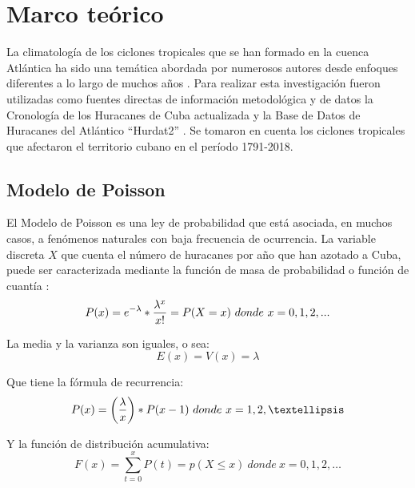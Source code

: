 \chapter{Marco teórico}

La climatología de los ciclones tropicales que se han formado en la cuenca Atlántica ha sido una temática abordada por numerosos autores desde enfoques diferentes a lo largo de muchos años \cite{DK76, DK1, DK7}. Para realizar esta investigación fueron utilizadas como fuentes directas de información metodológica y de datos la Cronología de los Huracanes de Cuba actualizada \cite{DK5} y la Base de Datos de Huracanes del Atlántico “Hurdat2” \cite{DK3}. Se tomaron en cuenta los ciclones tropicales que afectaron el territorio cubano en el período 1791-2018. 

\section{Modelo de Poisson}
El Modelo de Poisson es una ley de probabilidad que está asociada, en muchos casos, a fenómenos naturales con baja frecuencia de ocurrencia. La variable discreta $X$ que cuenta el número de huracanes por año que han azotado a Cuba, puede ser caracterizada mediante la función de masa de probabilidad o función de cuantía \cite{DK6}:\\

\begin{equation}
P(x) = e^{-\lambda}*{\lambda^{x}\over x!} = P(X = x)\ donde\ x = 0,1,2,...
 \end{equation}
 
 La media y la varianza son iguales, o sea:\\
\begin{equation}
E(x)=V(x)=\lambda                                                                                                              
 \end{equation}

Que tiene la fórmula de recurrencia:\\
\begin{equation}
P(x)=\left({\lambda \over x}\right) * P(x-1)\  donde\ x=1,2,…
\end{equation}
 



 Y la función de distribución acumulativa:\\
 \begin{equation}
F(x)=\sum_{t=0}^{x}P(t) = p(X\leq x)\  donde\ x=0,1,2,…                                                          
 \end{equation}
 
